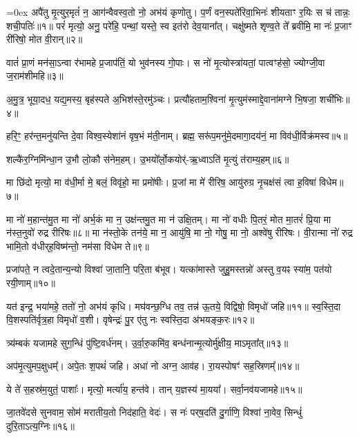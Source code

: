 \let\oldparskip\parskip
\parskip=0ex
अपै॑तु मृ॒त्युर॒मृतं॑ न॒ आग॑न्वैवस्व॒तो नो॒ अभ॑यं कृणोतु।
प॒र्णं वन॒स्पते॑रिवा॒भिनः॑ शीयताꣳ र॒यिः स च॑ तान्नः॒ शची॒पतिः॑॥१॥
परं॑ मृत्यो॒ अनु॒ परे॑हि॒ पन्थां॒ यस्ते॒ स्व इत॑रो देव॒याना᳚त्।
चक्षु॑ष्मते शृण्व॒ते ते᳚ ब्रवीमि॒ मा नः॑ प्र॒जाꣳ री॑रिषो॒ मोत वी॒रान्॥२॥

वातं॑ प्रा॒णं मन॑सा॒ऽन्वा र॑भामहे प्र॒जाप॑तिं॒ यो भुव॑नस्य गो॒पाः।
स नो॑ मृ॒त्योस्त्रा॑यतां॒ पात्वꣳह॑सो॒ ज्योग्जी॒वा ज॒राम॑शीमहि॥३॥

अ॒मु॒त्र॒ भूया॒दध॒ यद्य॒मस्य॒ बृह॑स्पते अ॒भिश॑स्ते॒रमु॑ञ्चः।
प्रत्यौ॑हताम॒श्विना॑ मृ॒त्युम॑स्माद्दे॒वाना॑मग्ने भि॒षजा॒ शची॑भिः॥४॥

हरि॒ꣳ॒ हर॑न्त॒मनु॑यन्ति दे॒वा विश्व॒स्येशा॑नं वृष॒भं म॑ती॒नाम्।
ब्रह्म॒ सरू॑प॒मनु॑मे॒दमागा॒दय॑नं॒ मा विव॑धी॒र्विक्र॑मस्व॥५॥

शल्कै॑र॒ग्निमि॑न्धा॒न उ॒भौ लो॒कौ स॑नेम॒हम्।
उ॒भयो᳚र्लो॒कयोर्॑-ऋ॒ध्वाऽति॑ मृ॒त्युं त॑राम्य॒हम्॥६॥

मा छि॑दो मृत्यो॒ मा व॑धी॒र्मा मे॒ बलं॒ विवृ॑हो॒ मा प्रमो॑षीः।
प्र॒जां मा मे॑ रीरिष॒ आयु॑रुग्र नृ॒चक्ष॑सं त्वा ह॒विषा॑ विधेम॥७॥

मा नो॑ म॒हान्त॑मु॒त मा नो॑ अर्भ॒कं मा न॒ उक्ष॑न्तमु॒त मा न॑ उक्षि॒तम्।
 मा नो॑ वधीः पि॒तरं॒ मोत मा॒तरं॑ प्रि॒या मा न॑स्त॒नुवो॑ रुद्र रीरिषः॥८॥
 मा न॑स्तो॒के तन॑ये॒ मा न॒ आयु॑षि॒ मा नो॒ गोषु॒ मा नो॒ अश्वे॑षु रीरिषः।
 वी॒रान्मा नो॑ रुद्र भामि॒तो व॑धीर्‌ह॒विष्म॑न्तो॒ नम॑सा विधेम ते॥९॥

प्रजा॑पते॒ न त्वदे॒तान्य॒न्यो विश्वा॑ जा॒तानि॒ परि॒ता ब॑भूव।
यत्का॑मास्ते जुहु॒मस्तन्नो॑ अस्तु व॒यꣴ स्या॑म॒ पत॑यो रयी॒णाम्॥१०॥

यत॑ इन्द्र॒ भया॑महे॒ ततो॑ नो॒ अभ॑यं कृधि।
मघ॑वन्छ॒ग्धि तव॒ तन्न॑ ऊ॒तये॒ विद्विषो॒ विमृधो॑ जहि॥११॥
स्व॒स्ति॒दा वि॒शस्पति॑र्वृत्र॒हा विमृधो॑ व॒शी।
वृषेन्द्रः॑ पु॒र ए॑तु नः स्वस्ति॒दा अ॑भयङ्क॒रः॥१२॥

त्र्य॑म्बकं यजामहे सुग॒न्धिं पु॑ष्टि॒वर्ध॑नम्।
 उ॒र्वा॒रु॒कमि॑व॒ बन्ध॑नान्मृ॒त्योर्मु॑क्षीय॒ माऽमृता᳚त्॥१३॥

अप॑मृ॒त्युमप॒क्षुधम्᳚।   अपे॒तः श॒पथं॑ जहि।
अधा॑ नो अग्न॒ आव॑ह।   रा॒यस्पोषꣳ॑ सह॒स्रिणम्᳚॥१४॥

ये ते॑ स॒हस्र॑म॒युतं॒ पाशाः᳚।   मृत्यो॒ मर्त्या॑य॒ हन्त॑वे।
तान् य॒ज्ञस्य॑ मा॒यया᳚।   सर्वा॒नव॑यजामहे॥१५॥

जा॒तवे॑दसे सुनवाम॒ सोम॑ मरातीय॒तो निद॑हाति॒ वेदः॑।
स नः॑ पर्‌ष॒दति॑ दु॒र्गाणि॒ विश्वा॑ ना॒वेव॒ सिन्धुं॑ दुरि॒ताऽत्य॒ग्निः॥१६॥


